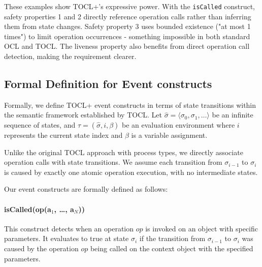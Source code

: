 These examples show TOCL+'s expressive power. With the \texttt{isCalled} construct, 
safety properties 1 and 2 directly reference operation calls rather than inferring 
them from state changes. Safety property 3 uses bounded existence ("at most 1 times") 
to limit operation occurrences - something impossible in both standard OCL and TOCL. 
The liveness property also benefits from direct operation call detection, making 
the requirement clearer.


\subsection{Formal Definition for Event constructs}

\hspace{1cm} Formally, we define TOCL+ event constructs in terms of state transitions 
within the semantic framework established by TOCL. Let 
$\hat{\sigma} = \langle \sigma_0, \sigma_1, \ldots \rangle$ 
be an infinite sequence of states, and 
$\tau = (\hat{\sigma}, i, \beta)$ 
be an evaluation environment where $i$ represents the current state index and $\beta$ 
is a variable assignment.

Unlike the original TOCL approach with process types, we directly associate operation 
calls with state transitions. We assume each transition from 
$\sigma_{i-1}$ to $\sigma_i$ 
is caused by exactly one atomic operation execution, with no intermediate states.

Our event constructs are formally defined as follows:
\vspace{-1.5em}
\paragraph{isCalled(op(a$_1$, \ldots, a$_N$))}
This construct detects when an operation $op$ is invoked on an object with specific 
parameters. It evaluates to true at state $\sigma_i$ if the transition from 
$\sigma_{i-1}$ to $\sigma_i$ was caused by the operation $op$ being called on the 
context object with the specified parameters.

